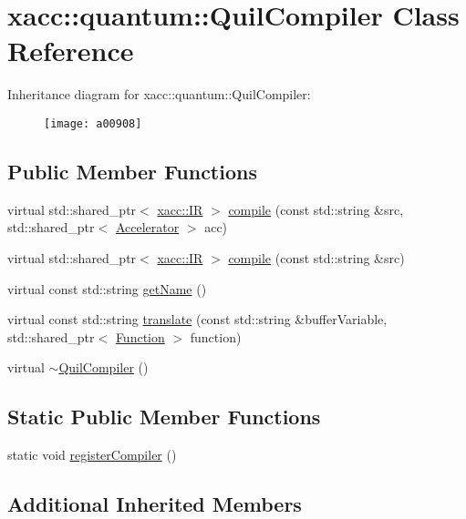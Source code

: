 \hypertarget{a00908}{}\section{xacc\+:\+:quantum\+:\+:Quil\+Compiler Class Reference}
\label{a00908}
Inheritance diagram for xacc\+:\+:quantum\+:\+:Quil\+Compiler\+:\begin{figure}[H]
\begin{center}
\leavevmode
\texttt{[image: a00908]}
\end{center}
\end{figure}
\subsection*{Public Member Functions}
\begin{DoxyCompactItemize}
\item 
virtual std\+::shared\+\_\+ptr$<$ \hyperlink{a01148}{xacc\+::\+IR} $>$ \hyperlink{a00908_a2421482415ca4e09963ea4ecddff8100}{compile} (const std\+::string \&src, std\+::shared\+\_\+ptr$<$ \hyperlink{a01084}{Accelerator} $>$ acc)
\item 
virtual std\+::shared\+\_\+ptr$<$ \hyperlink{a01148}{xacc\+::\+IR} $>$ \hyperlink{a00908_adf4d321ecb0df3fa7728999f941c83b2}{compile} (const std\+::string \&src)
\item 
virtual const std\+::string \hyperlink{a00908_ae7d52140b6dd52730edc6e38ae48f437}{get\+Name} ()
\item 
virtual const std\+::string \hyperlink{a00908_a66ca00bbb1f30e7bc6dd86b1e267b93b}{translate} (const std\+::string \&buffer\+Variable, std\+::shared\+\_\+ptr$<$ \hyperlink{a01124}{Function} $>$ function)
\item 
virtual \hyperlink{a00908_a0866a9f695f28c90ac1f4754374f3bfe}{$\sim$\+Quil\+Compiler} ()
\end{DoxyCompactItemize}
\subsection*{Static Public Member Functions}
\begin{DoxyCompactItemize}
\item 
static void \hyperlink{a00908_aaec99a14bede717bf02a0f65af2a3c69}{register\+Compiler} ()
\end{DoxyCompactItemize}
\subsection*{Additional Inherited Members}


